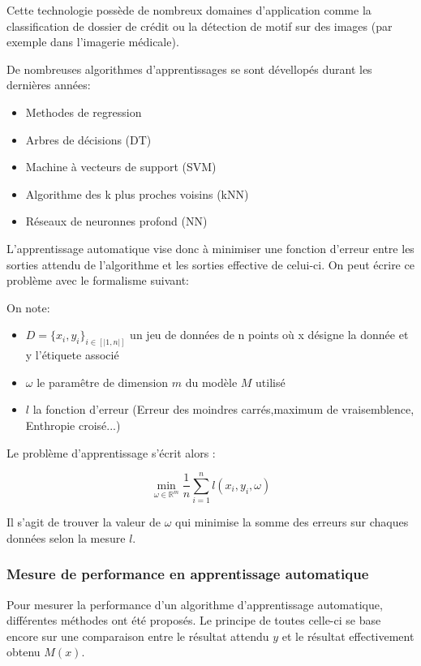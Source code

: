 \documentclass[stage3a]{tnreport} %
\begin{document}
Cette technologie possède de nombreux domaines d'application comme la classification de dossier de crédit ou la détection de motif sur des images (par exemple dans l'imagerie médicale).

De nombreuses algorithmes d'apprentissages se sont dévellopés durant les dernières années:
\begin{itemize}
  \item Methodes de regression 
  \item Arbres de décisions (DT)
  \item Machine à vecteurs de support (SVM)
  \item Algorithme des k plus proches voisins (kNN)
  \item Réseaux de neuronnes profond (NN)
\end{itemize}

L'apprentissage automatique vise donc à minimiser une fonction d'erreur entre les sorties attendu de l'algorithme et les sorties effective de celui-ci. On peut écrire ce problème avec le formalisme suivant:

On note:

\begin{itemize}
  \item $D = \{x_i,y_i\}_{i\in[|1,n|]}$ un jeu de données de n points où x désigne la donnée et y l'étiquete associé
  \item $\omega$ le paramêtre de dimension $m$ du modèle $M$ utilisé
  \item $l$ la fonction d'erreur (Erreur des moindres carrés,maximum de vraisemblence, Enthropie croisé...)
\end{itemize}

Le problème d'apprentissage s'écrit alors :

\begin{equation}
  \min_{\omega \in \mathbb{R}^m} \frac{1}{n} \sum_{i=1}^n l(x_i,y_i,\omega)
\end{equation}

Il s'agit de trouver la valeur de $\omega$ qui minimise la somme des erreurs sur chaques données selon la mesure $l$.

\subsubsection{Mesure de performance en apprentissage automatique}

Pour mesurer la performance d'un algorithme d'apprentissage automatique, différentes méthodes ont été proposés. Le principe de toutes celle-ci se base encore sur une comparaison entre le résultat attendu $y$ et le résultat effectivement obtenu $M(x)$.
\end{document}
